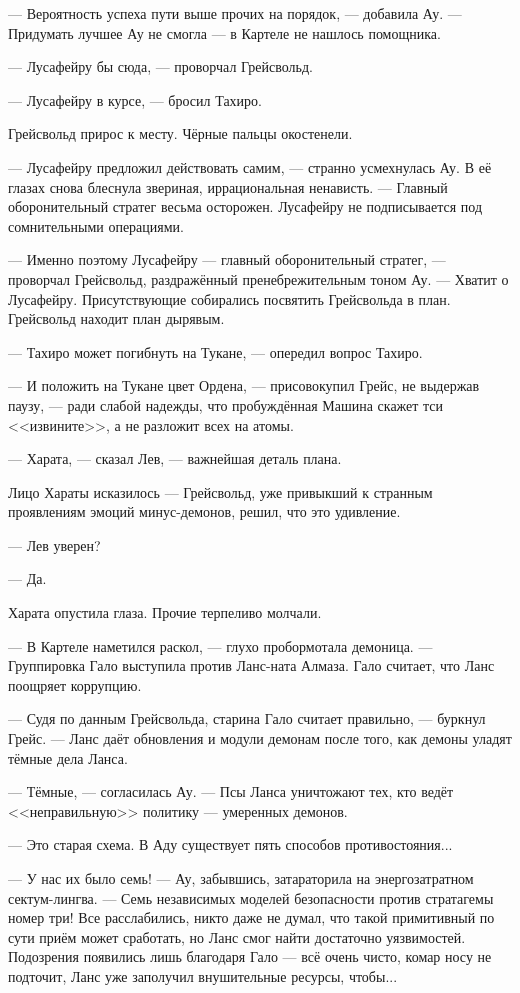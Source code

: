 --- Вероятность успеха пути выше прочих на порядок, --- добавила Ау.
--- Придумать лучшее Ау не смогла --- в Картеле не нашлось помощника.

--- Лусафейру бы сюда, --- проворчал Грейсвольд.

--- Лусафейру в курсе, --- бросил Тахиро.

Грейсвольд прирос к месту.
Чёрные пальцы окостенели.

--- Лусафейру предложил действовать самим, --- странно усмехнулась Ау.
В её глазах снова блеснула звериная, иррациональная ненависть.
--- Главный оборонительный стратег весьма осторожен.
Лусафейру не подписывается под сомнительными операциями.

--- Именно поэтому Лусафейру --- главный оборонительный стратег, --- проворчал Грейсвольд, раздражённый пренебрежительным тоном Ау.
--- Хватит о Лусафейру.
Присутствующие собирались посвятить Грейсвольда в план.
Грейсвольд находит план дырявым.

--- Тахиро может погибнуть на Тукане, --- опередил вопрос Тахиро.

--- И положить на Тукане цвет Ордена, --- присовокупил Грейс, не выдержав паузу, --- ради слабой надежды, что пробуждённая Машина скажет тси <<извините>>, а не разложит всех на атомы.

--- Харата, --- сказал Лев, --- важнейшая деталь плана.

Лицо Хараты исказилось --- Грейсвольд, уже привыкший к странным проявлениям эмоций минус-демонов, решил, что это удивление.

--- Лев уверен?

--- Да.

Харата опустила глаза.
Прочие терпеливо молчали.

--- В Картеле наметился раскол, --- глухо пробормотала демоница.
--- Группировка Гало выступила против Ланс-ната Алмаза.
Гало считает, что Ланс поощряет коррупцию.

--- Судя по данным Грейсвольда, старина Гало считает правильно, --- буркнул Грейс.
--- Ланс даёт обновления и модули демонам после того, как демоны уладят тёмные дела Ланса.

--- Тёмные, --- согласилась Ау.
--- Псы Ланса уничтожают тех, кто ведёт <<неправильную>> политику --- умеренных демонов.

--- Это старая схема.
В Аду существует пять способов противостояния...

--- У нас их было семь! --- Ау, забывшись, затараторила на энергозатратном сектум-лингва.
--- Семь независимых моделей безопасности против стратагемы номер три!
Все расслабились, никто даже не думал, что такой примитивный по сути приём может сработать, но Ланс смог найти достаточно уязвимостей.
Подозрения появились лишь благодаря Гало --- всё очень чисто, комар носу не подточит, Ланс уже заполучил внушительные ресурсы, чтобы...

